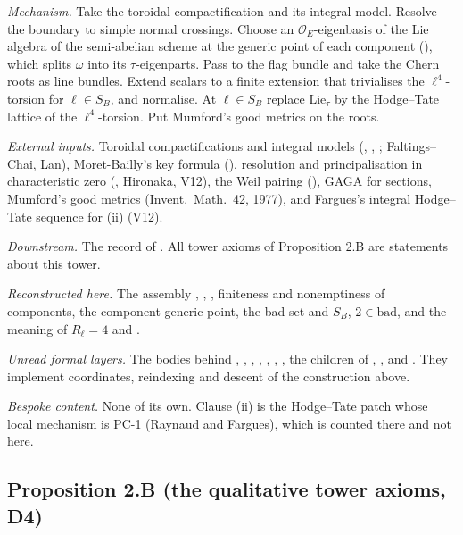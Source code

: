 \documentclass[11pt]{article}
\theoremstyle{remark}
\begin{document}
\emph{Mechanism.} Take the toroidal compactification and its integral model. Resolve the boundary to simple normal crossings. Choose an $\mathcal O_E$-eigenbasis of the Lie algebra of the semi-abelian scheme at the generic point of each component (), which splits $\omega$ into its $\tau$-eigenparts. Pass to the flag bundle and take the Chern roots as line bundles. Extend scalars to a finite extension that trivialises the $\ell^4$-torsion for $\ell\in S_B$, and normalise. At $\ell\in S_B$ replace $\mathrm{Lie}_\tau$ by the Hodge--Tate lattice of the $\ell^4$-torsion. Put Mumford's good metrics on the roots.

\emph{External inputs.} Toroidal compactifications and integral models (, , ; Faltings--Chai, Lan), Moret-Bailly's key formula (), resolution and principalisation in characteristic zero (, Hironaka, V12), the Weil pairing (), GAGA for sections, Mumford's good metrics (Invent.\ Math.\ 42, 1977), and Fargues's integral Hodge--Tate sequence for (ii) (V12).

\emph{Downstream.} The record  of . All tower axioms of Proposition 2.B are statements about this tower.

\emph{Reconstructed here.} The assembly , , , finiteness and nonemptiness of components, the component generic point, the bad set and $S_B$, $2\in\mathrm{bad}$, and the meaning of $R_\ell=4$ and .

\emph{Unread formal layers.} The bodies behind , , , , , , , the children of , ,  and . They implement coordinates, reindexing and descent of the construction above.

\emph{Bespoke content.} None of its own. Clause (ii) is the Hodge--Tate patch whose local mechanism is PC-1 (Raynaud and Fargues), which is counted there and not here.

\subsection*{Proposition 2.B (the qualitative tower axioms, D4)}
\end{document}
